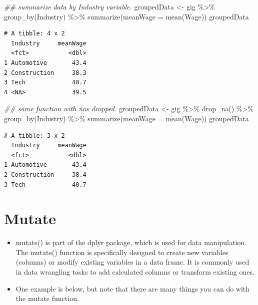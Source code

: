 \documentclass[
  letterpaper,
  DIV=11,
  numbers=noendperiod]{scrreprt}
\newenvironment{Shaded}{\begin{snugshade}}{\end{snugshade}}
\newcommand{\AttributeTok}[1]{\textcolor[rgb]{0.40,0.45,0.13}{#1}}
\newcommand{\DocumentationTok}[1]{\textcolor[rgb]{0.37,0.37,0.37}{\textit{#1}}}
\newcommand{\FunctionTok}[1]{\textcolor[rgb]{0.28,0.35,0.67}{#1}}
\newcommand{\NormalTok}[1]{\textcolor[rgb]{0.00,0.23,0.31}{#1}}
\newcommand{\OtherTok}[1]{\textcolor[rgb]{0.00,0.23,0.31}{#1}}
\newcommand{\SpecialCharTok}[1]{\textcolor[rgb]{0.37,0.37,0.37}{#1}}
\providecommand{\tightlist}{%
  \setlength{\itemsep}{0pt}\setlength{\parskip}{0pt}}\usepackage{longtable,booktabs,array}
\begin{document}
\begin{Shaded}
\begin{Highlighting}[]
\DocumentationTok{\#\# summarize data by Industry variable.}
\NormalTok{groupedData }\OtherTok{\textless{}{-}}\NormalTok{ gig }\SpecialCharTok{\%\textgreater{}\%}
    \FunctionTok{group\_by}\NormalTok{(Industry) }\SpecialCharTok{\%\textgreater{}\%}
    \FunctionTok{summarize}\NormalTok{(}\AttributeTok{meanWage =} \FunctionTok{mean}\NormalTok{(Wage))}
\NormalTok{groupedData}
\end{Highlighting}
\end{Shaded}

\begin{verbatim}
# A tibble: 4 x 2
  Industry     meanWage
  <fct>           <dbl>
1 Automotive       43.4
2 Construction     38.3
3 Tech             40.7
4 <NA>             39.5
\end{verbatim}

\begin{Shaded}
\begin{Highlighting}[]
\DocumentationTok{\#\# same function with na\textquotesingle{}s dropped.}
\NormalTok{groupedData }\OtherTok{\textless{}{-}}\NormalTok{ gig }\SpecialCharTok{\%\textgreater{}\%}
    \FunctionTok{drop\_na}\NormalTok{() }\SpecialCharTok{\%\textgreater{}\%}
    \FunctionTok{group\_by}\NormalTok{(Industry) }\SpecialCharTok{\%\textgreater{}\%}
    \FunctionTok{summarize}\NormalTok{(}\AttributeTok{meanWage =} \FunctionTok{mean}\NormalTok{(Wage))}
\NormalTok{groupedData}
\end{Highlighting}
\end{Shaded}

\begin{verbatim}
# A tibble: 3 x 2
  Industry     meanWage
  <fct>           <dbl>
1 Automotive       43.4
2 Construction     38.4
3 Tech             40.7
\end{verbatim}


\chapter{Mutate}\label{mutate}

\begin{itemize}
\tightlist
\item
  mutate() is part of the dplyr package, which is used for data
  manipulation. The mutate() function is specifically designed to create
  new variables (columns) or modify existing variables in a data frame.
  It is commonly used in data wrangling tasks to add calculated columns
  or transform existing ones.
\item
  One example is below, but note that there are many things you can do
  with the mutate function.
\end{itemize}
\end{document}
